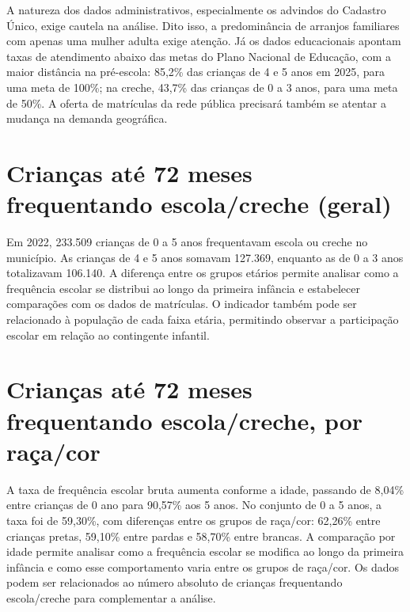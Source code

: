 A natureza dos dados administrativos, especialmente os advindos do Cadastro Único, exige cautela na análise. Dito isso, a predominância de arranjos familiares com apenas uma mulher adulta exige atenção. Já os dados educacionais apontam taxas de atendimento abaixo das metas do Plano Nacional de Educação, com a maior distância na pré-escola: 85,2\% das crianças de 4 e 5 anos em 2025, para uma meta de 100\%; na creche, 43,7\% das crianças de 0 a 3 anos, para uma meta de 50\%. A oferta de matrículas da rede pública precisará também se atentar a mudança na demanda geográfica.

\section{Crianças até 72 meses frequentando escola/\allowbreak{}creche (geral)}


Em 2022, 233.509 crianças de 0 a 5 anos frequentavam escola ou creche no município. As crianças de 4 e 5 anos somavam 127.369, enquanto as de 0 a 3 anos totalizavam 106.140. A diferença entre os grupos etários permite analisar como a frequência escolar se distribui ao longo da primeira infância e estabelecer comparações com os dados de matrículas. O indicador também pode ser relacionado à população de cada faixa etária, permitindo observar a participação escolar em relação ao contingente infantil.


\section{Crianças até 72 meses frequentando escola/\allowbreak{}creche, por raça/\allowbreak{}cor}


A taxa de frequência escolar bruta aumenta conforme a idade, passando de 8,04\% entre crianças de 0 ano para 90,57\% aos 5 anos. No conjunto de 0 a 5 anos, a taxa foi de 59,30\%, com diferenças entre os grupos de raça/cor: 62,26\% entre crianças pretas, 59,10\% entre pardas e 58,70\% entre brancas. A comparação por idade permite analisar como a frequência escolar se modifica ao longo da primeira infância e como esse comportamento varia entre os grupos de raça/cor. Os dados podem ser relacionados ao número absoluto de crianças frequentando escola/creche para complementar a análise.


